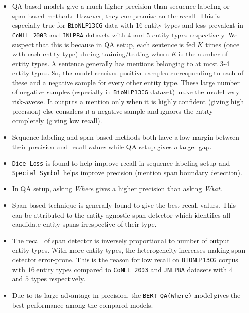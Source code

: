\begin{itemize}
    \item QA-based models give a much higher precision than sequence labeling or span-based methods. However, they compromise on the recall. This is especially true for \texttt{BioNLP13CG} data with $16$ entity types and less prevalent in \texttt{CoNLL 2003} and \texttt{JNLPBA} datasets with $4$ and $5$ entity types respectively. We suspect that this is because in QA setup, each sentence is fed $K$ times (once with each entity type) during training/testing where $K$ is the number of entity types. A sentence generally has mentions belonging to at most 3-4 entity types. So, the model receives positive samples corresponding to each of these and a negative sample for every other entity type. These large number of negative samples (especially in \texttt{BioNLP13CG} dataset) make the model very risk-averse. It outputs a mention only when it is highly confident (giving high precision) else considers it a negative sample and ignores the entity completely (giving low recall).
    
    \item Sequence labeling and span-based methods both have a low margin between their precision and recall values while QA setup gives a larger gap. 
    
    \item \texttt{Dice Loss} is found to help improve recall in sequence labeling setup and \texttt{Special Symbol} helps improve precision (mention span boundary detection).
    
    \item In QA setup, asking \textit{Where} gives a higher precision than asking \textit{What}.
    
    \item Span-based technique is generally found to give the best recall values. This can be attributed to the entity-agnostic span detector which identifies all candidate entity spans irrespective of their type.
    
    \item The recall of span detector is inversely proportional to number of output entity types. With more entity types, the heterogeneity increases making span detector error-prone. This is the reason for low recall on \texttt{BIONLP13CG} corpus with $16$ entity types compared to \texttt{CoNLL 2003} and \texttt{JNLPBA} datasets with $4$ and $5$ types respectively.
    
    \item Due to its large advantage in precision, the \texttt{BERT-QA(Where)} model gives the best performance among the compared models.
\end{itemize}

